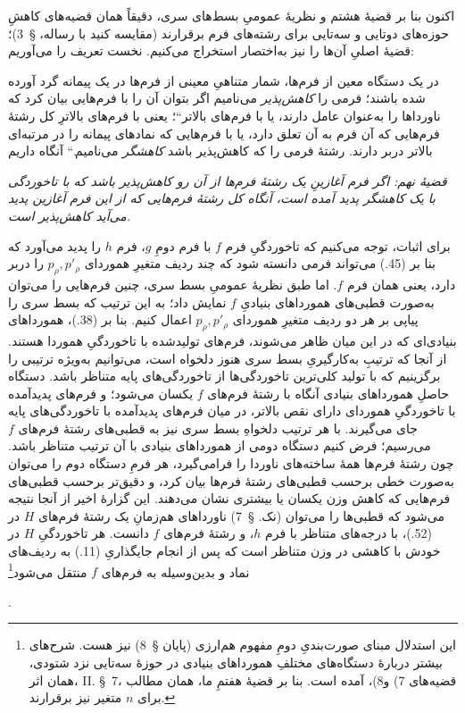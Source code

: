 \documentclass[11pt]{article}
\providecommand{\glqq}{\textquotedblbase}
\providecommand{\grqq}{\textquotedblleft}
\newcommand{\srcLTR}[1]{\relax\ifmmode\text{\mbox{\babelsublr{\foreignlanguage{english}{#1}}}}\else\babelsublr{\foreignlanguage{english}{#1}}\fi}
\newcommand{\srcfn}[2]{\begingroup\renewcommand{\thefootnote}{\srcLTR{#1}}\footnote{#2}\addtocounter{footnote}{-1}\endgroup}
\begin{document}
اکنون بنا بر قضیهٔ هشتم و نظریهٔ عمومیِ بسط‌های سری، دقیقاً همان قضیه‌های کاهشِ حوزه‌های دوتایی و سه‌تایی برای رشته‌های فرم برقرارند (مقایسه کنید با رساله، \S\ 3)؛ قضیهٔ اصلیِ آن‌ها را نیز به‌اختصار استخراج می‌کنیم. نخست تعریف را می‌آوریم:

\glqq{}در یک دستگاه معین از فرم‌ها، شمار متناهیِ معینی از فرم‌ها در یک پیمانه گرد آورده شده باشند؛ فرمی را \emph{کاهش‌پذیر} می‌نامیم اگر بتوان آن را با فرم‌هایی بیان کرد که ناورداها را به‌عنوان عامل دارند، یا با \glqq{}فرم‌های بالاتر\grqq{}؛ یعنی با فرم‌های بالاترِ کل رشتهٔ فرم‌هایی که آن فرم به آن تعلق دارد، یا با فرم‌هایی که نمادهای پیمانه را در مرتبه‌ای بالاتر دربر دارند. رشتهٔ فرمی را که کاهش‌پذیر باشد \emph{کاهشگر} می‌نامیم.\grqq{} آنگاه داریم

\emph{قضیهٔ نهم: اگر فرم آغازینِ یک رشتهٔ فرم‌ها از آن رو کاهش‌پذیر باشد که با تاخوردگی با یک کاهشگر پدید آمده است، آنگاه کل رشتهٔ فرم‌هایی که از این فرم آغازین پدید می‌آید کاهش‌پذیر است.}

برای اثبات، توجه می‌کنیم که تاخوردگیِ فرم $f$ با فرم دومِ $g$، فرم $h$ را پدید می‌آورد که بنا بر (45.) می‌تواند فرمی دانسته شود که چند ردیف متغیرِ هموردای $p_\rho,p'_\rho$ را دربر دارد، یعنی همان فرم $f$. اما طبق نظریهٔ عمومیِ بسط سری، چنین فرم‌هایی را می‌توان به‌صورت قطبی‌های همورداهای بنیادیِ $f$ نمایش داد؛ به این ترتیب که بسط سری را پیاپی بر هر دو ردیف متغیرِ هموردای $p_\rho,p'_\rho$ اعمال کنیم. بنا بر (38.)، همورداهای بنیادی‌ای که در این میان ظاهر می‌شوند، فرم‌های تولیدشده با تاخوردگیِ هموردا هستند. از آنجا که ترتیبِ به‌کارگیریِ بسط سری هنوز دلخواه است، می‌توانیم به‌ویژه ترتیبی را برگزینیم که با تولید کلی‌ترین تاخوردگی‌ها از تاخوردگی‌های پایه متناظر باشد. دستگاه حاصلِ همورداهای بنیادی آنگاه با رشتهٔ فرم‌های $f$ یکسان می‌شود؛ و فرم‌های پدیدآمده با تاخوردگیِ هموردای دارای نقص بالاتر، در میان فرم‌های پدیدآمده با تاخوردگی‌های پایه جای می‌گیرند. با هر ترتیب دلخواهِ بسط سری نیز به قطبی‌های رشتهٔ فرم‌های $f$ می‌رسیم؛ فرض کنیم دستگاه دومی از همورداهای بنیادی با آن ترتیب متناظر باشد. چون رشتهٔ فرم‌ها همهٔ ساخته‌های ناوردا را فرامی‌گیرد، هر فرمِ دستگاه دوم را می‌توان به‌صورت خطی برحسب قطبی‌های رشتهٔ فرم‌ها بیان کرد، و دقیق‌تر برحسب قطبی‌های فرم‌هایی که کاهش وزن یکسان یا بیشتری نشان می‌دهند. این گزارهٔ اخیر از آنجا نتیجه می‌شود که قطبی‌ها را می‌توان (نک. \S\ 7) ناورداهای هم‌زمانِ یک رشتهٔ فرم‌های $H$ در (52.)، با درجه‌های متناظر با فرم $h$، و رشتهٔ فرم‌های $f$ دانست. هر تاخوردگیِ $H$ در خودش با کاهشی در وزن متناظر است که پس از انجام جایگذاریِ (11.) به ردیف‌های نماد و بدین‌وسیله به فرم‌های $f$ منتقل می‌شود\srcfn{*)}{این استدلال مبنای صورت‌بندیِ دومِ مفهوم هم‌ارزی (پایان \S\ 8) نیز هست. شرح‌های بیشتر دربارهٔ دستگاه‌های مختلفِ همورداهای بنیادی در حوزهٔ سه‌تایی نزد شتودی، همان اثر، II. \S\ 7، قضیه‌های 7) و8)، آمده است. بنا بر قضیهٔ هفتمِ ما، همان مطالب برای $n$ متغیر نیز برقرارند.}.
\end{document}
